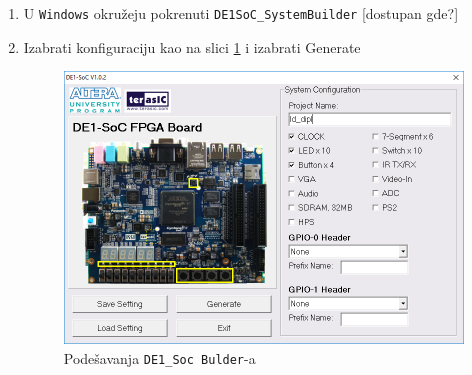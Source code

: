 \newcommand\tab[1][1cm]{\hspace*{#1}}
\begin{enumerate}

\item U \texttt{Windows} okružeju pokrenuti \texttt{DE1SoC\_SystemBuilder} [dostupan gde?]
\item Izabrati konfiguraciju kao na slici \ref{slika:sb} i izabrati Generate\\
\begin{figure}[h!]
\centering
\includegraphics[scale=0.8]{img/DE1SoC_SystemBuilder.png}
\caption{Podešavanja \texttt{DE1\_Soc Bulder}-a}
\label{slika:sb}
\end{figure}\\


\end{enumerate}
